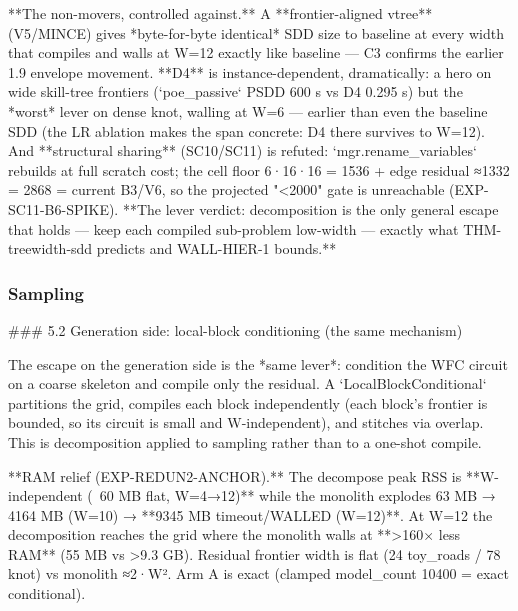 \documentclass[letterpaper]{article} %
\begin{document}
**The non-movers, controlled against.** A **frontier-aligned vtree** (V5/MINCE) gives *byte-for-byte
identical* SDD size to baseline at every width that compiles and walls at W=12 exactly like baseline —
C3 confirms the earlier 1.9%
envelope movement. **D4** is instance-dependent, dramatically: a hero on wide skill-tree frontiers
(`poe_passive` PSDD 600 s vs D4 0.295 s) but the *worst* lever on dense knot, walling at W=6 — earlier
than even the baseline SDD (the LR ablation makes the span concrete: D4 there survives to W=12). And
**structural sharing** (SC10/SC11) is refuted: `mgr.rename_variables` rebuilds at full scratch cost;
the cell floor 6·16·16 = 1536 + edge residual ≈1332 = 2868 = current B3/V6, so the projected "<2000"
gate is unreachable (EXP-SC11-B6-SPIKE). **The lever verdict: decomposition is the only general
escape that holds — keep each compiled sub-problem low-width — exactly what THM-treewidth-sdd predicts
and WALL-HIER-1 bounds.**

\subsubsection{Sampling}
### 5.2 Generation side: local-block conditioning (the same mechanism)

The escape on the generation side is the *same lever*: condition the WFC circuit on a coarse skeleton
and compile only the residual. A `LocalBlockConditional` partitions the grid, compiles each block
independently (each block's frontier is bounded, so its circuit is small and W-independent), and
stitches via overlap. This is decomposition applied to sampling rather than to a one-shot compile.

**RAM relief (EXP-REDUN2-ANCHOR).** The decompose peak RSS is **W-independent (~60 MB flat, W=4→12)**
while the monolith explodes 63 MB → 4164 MB (W=10) → **9345 MB timeout/WALLED (W=12)**. At W=12 the
decomposition reaches the grid where the monolith walls at **>160× less RAM** (55 MB vs >9.3 GB).
Residual frontier width is flat (24 toy_roads / 78 knot) vs monolith ≈2·W². Arm A is exact (clamped
model_count 10400 = exact conditional).
\end{document}
